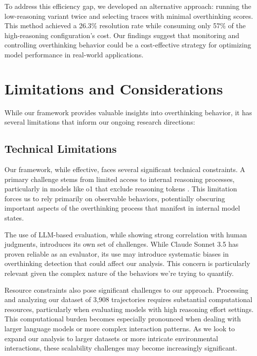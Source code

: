 To address this efficiency gap, we developed an alternative approach: running the low-reasoning variant twice and selecting traces with minimal overthinking scores. This method achieved a 26.3\% resolution rate while consuming only 57\% of the high-reasoning configuration's cost. Our findings suggest that monitoring and controlling overthinking behavior could be a cost-effective strategy for optimizing model performance in real-world applications.

\section{Limitations and Considerations}
\label{sec:limitations}

While our framework provides valuable insights into overthinking behavior, it has several limitations that inform our ongoing research directions:

\subsection{Technical Limitations}
Our framework, while effective, faces several significant technical constraints. A primary challenge stems from limited access to internal reasoning processes, particularly in models like o1 that exclude reasoning tokens \cite{openai_learning_to_reason_2024}. This limitation forces us to rely primarily on observable behaviors, potentially obscuring important aspects of the overthinking process that manifest in internal model states.

The use of LLM-based evaluation, while showing strong correlation with human judgments, introduces its own set of challenges. While Claude Sonnet 3.5 has proven reliable as an evaluator, its use may introduce systematic biases in overthinking detection that could affect our analysis. This concern is particularly relevant given the complex nature of the behaviors we're trying to quantify.

Resource constraints also pose significant challenges to our approach. Processing and analyzing our dataset of 3,908 trajectories requires substantial computational resources, particularly when evaluating models with high reasoning effort settings. This computational burden becomes especially pronounced when dealing with larger language models or more complex interaction patterns. As we look to expand our analysis to larger datasets or more intricate environmental interactions, these scalability challenges may become increasingly significant.

